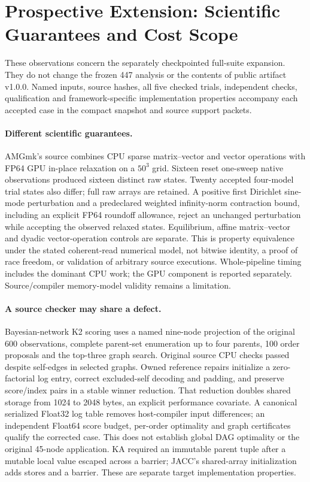 \section{Prospective Extension: Scientific Guarantees and Cost Scope}
\label{sec:extension-observations}
These observations concern the separately checkpointed full-suite expansion. They do not change the frozen 447 analysis or the contents of public artifact v1.0.0. Named inputs, source hashes, all five checked trials, independent checks, qualification and framework-specific implementation properties accompany each accepted case in the compact snapshot and source support packets.

\paragraph{Different scientific guarantees.}
AMGmk's source combines CPU sparse matrix--vector and vector operations with FP64 GPU in-place relaxation on a $50^3$ grid. Sixteen reset one-sweep native observations produced sixteen distinct raw states. Twenty accepted four-model trial states also differ; full raw arrays are retained. A positive first Dirichlet sine-mode perturbation and a predeclared weighted infinity-norm contraction bound, including an explicit FP64 roundoff allowance, reject an unchanged perturbation while accepting the observed relaxed states. Equilibrium, affine matrix--vector and dyadic vector-operation controls are separate. This is property equivalence under the stated coherent-read numerical model, not bitwise identity, a proof of race freedom, or validation of arbitrary source executions. Whole-pipeline timing includes the dominant CPU work; the GPU component is reported separately. Source/compiler memory-model validity remains a limitation.

\paragraph{A source checker may share a defect.}
Bayesian-network K2 scoring uses a named nine-node projection of the original 600 observations, complete parent-set enumeration up to four parents, 100 order proposals and the top-three graph search. Original source CPU checks passed despite self-edges in selected graphs. Owned reference repairs initialize a zero-factorial log entry, correct excluded-self decoding and padding, and preserve score/index pairs in a stable winner reduction. That reduction doubles shared storage from 1024 to 2048 bytes, an explicit performance covariate. A canonical serialized Float32 log table removes host-compiler input differences; an independent Float64 score budget, per-order optimality and graph certificates qualify the corrected case. This does not establish global DAG optimality or the original 45-node application. KA required an immutable parent tuple after a mutable local value escaped across a barrier; JACC's shared-array initialization adds stores and a barrier. These are separate target implementation properties.

